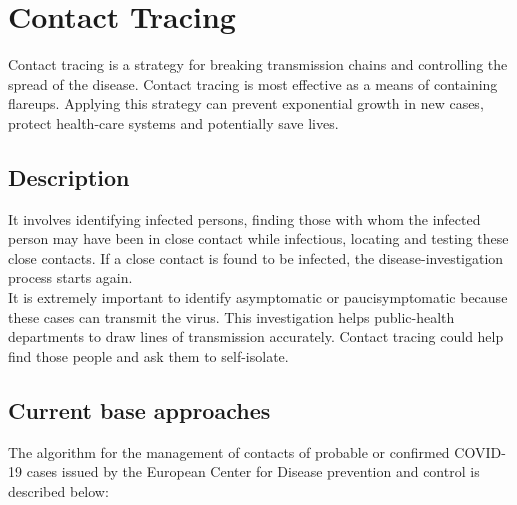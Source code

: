 {\color{PineGreen}\section{Contact Tracing}}

Contact tracing is a strategy for breaking transmission chains and controlling the spread of the disease. Contact tracing is most effective as a means of containing flareups. Applying this strategy can prevent exponential growth in new cases, protect health-care systems and potentially save lives.
\\
{\color{PineGreen}\subsection{Description}}
It involves identifying infected persons, finding those with whom the infected person may have been in close contact while infectious, locating and testing these close contacts. If a close contact is found to be infected, the disease-investigation process starts again.
\\
It is extremely important to identify asymptomatic or paucisymptomatic because these cases can transmit the virus. This investigation helps public-health departments to draw lines of transmission accurately. Contact tracing could help find those people and ask them to self-isolate.\\

{\color{PineGreen}\subsection{Current base approaches}}

The algorithm for the management of contacts of probable or confirmed COVID-19 cases issued by the 
European Center for Disease prevention and control is described below:

